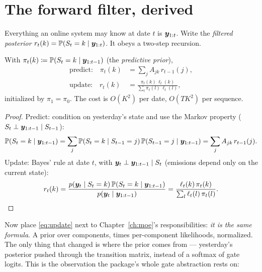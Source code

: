\section{The forward filter, derived}\label{sec:filter}

Everything an online system may know at date $t$ is $\bm{y}_{1:t}$. Write
the \emph{filtered posterior} $r_t(k) = \mathbb{P}(S_t = k \mid \bm{y}_{1:t})$.
It obeys a two-step recursion.

\begin{proposition}\label{prop:filter}
With $\pi_t(k) \coloneqq \mathbb{P}(S_t = k \mid \bm{y}_{1:t-1})$ (the
\emph{predictive prior}),
\begin{align}
  \text{predict:}\quad
  \pi_t(k) &= \sum_{j} A_{jk}\, r_{t-1}(j),
  \label{eq:predict}\\
  \text{update:}\quad
  r_t(k) &= \frac{\pi_t(k)\, \ell_t(k)}
                 {\sum_l \pi_t(l)\, \ell_t(l)},
  \label{eq:update}
\end{align}
initialized by $\pi_1 = \pi_0$. The cost is $O(K^2)$ per date, $O(TK^2)$
per sequence.
\end{proposition}

\begin{proof}
Predict: condition on yesterday's state and use the Markov property
($S_t \perp \bm{y}_{1:t-1} \mid S_{t-1}$):
\[
  \mathbb{P}(S_t = k \mid \bm{y}_{1:t-1})
  = \sum_j \mathbb{P}(S_t = k \mid S_{t-1} = j)\,
    \mathbb{P}(S_{t-1} = j \mid \bm{y}_{1:t-1})
  = \sum_j A_{jk}\, r_{t-1}(j).
\]
Update: Bayes' rule at date $t$, with $\bm{y}_t \perp \bm{y}_{1:t-1} \mid S_t$
(emissions depend only on the current state):
\[
  r_t(k)
  = \frac{p(\bm{y}_t \mid S_t = k)\, \mathbb{P}(S_t = k \mid \bm{y}_{1:t-1})}
         {p(\bm{y}_t \mid \bm{y}_{1:t-1})}
  = \frac{\ell_t(k)\, \pi_t(k)}{\sum_l \ell_t(l)\, \pi_t(l)}. \qedhere
\]
\end{proof}

Now place \eqref{eq:update} next to Chapter~\ref{ch:moe}'s
responsibilities: \emph{it is the same formula}. A prior over components,
times per-component likelihoods, normalized. The only thing that changed
is where the prior comes from --- yesterday's posterior pushed through
the transition matrix, instead of a softmax of gate logits. This is the
observation the package's whole gate abstraction rests on:


